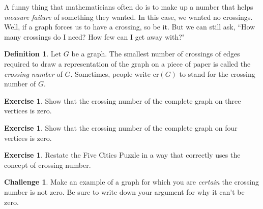 \documentclass[12pt,letterpaper]{article}
\theoremstyle{definition}
\newtheorem{exercise}[question]{Exercise}
\newtheorem*{challenge}{Challenge}
\newtheorem*{definition}{Definition}
\begin{document}
A funny thing that mathematicians often do is to make up a number that helps \emph{measure failure} of 
something they wanted. In this case, we wanted no crossings. Well, if a graph forces us to have a crossing, so be it.
But we can still ask, ``How many crossings do I need? How few can I get away with?"

\begin{definition}
Let $G$ be a graph. The smallest number of crossings of edges required to draw a representation of the graph on a piece of paper is called the \emph{crossing number} of $G$. Sometimes, people write $\mathrm{cr}(G)$ to stand for the crossing number of $G$.
\end{definition}

\begin{exercise}
Show that the crossing number of the complete graph on three vertices is zero.
\end{exercise}

\begin{exercise}
Show that the crossing number of the complete graph on four vertices is zero.
\end{exercise}

\begin{exercise}
Restate the Five Cities Puzzle in a way that correctly uses the concept of crossing number.
\end{exercise}

\begin{challenge}
Make an example of a graph for which you are \emph{certain} the crossing number is not zero.
Be sure to write down your argument for why it can't be zero.
\end{challenge}



\end{document}
